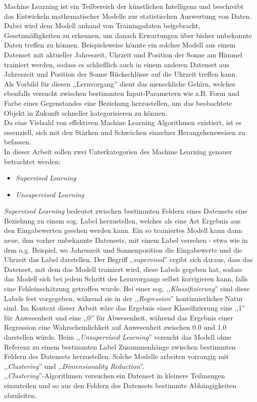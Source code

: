 Machine Learning ist ein Teilbereich der künstlichen Intelligenz und beschreibt das Entwickeln mathematischer 
Modelle zur statistischen Auswertung von Daten.\\
Dabei wird dem Modell anhand von Trainingsdaten beigebracht, Gesetzmäßigkeiten zu erkennen, um danach Erwartungen 
über bisher unbekannte Daten treffen zu können.  
Beispielsweise könnte ein solches Modell aus einem Datenset mit aktueller Jahreszeit, Uhrzeit und 
Position der Sonne am Himmel trainiert werden, sodass es schließlich auch in einem anderen Datenset 
aus Jahreszeit und Position der Sonne Rückschlüsse auf die Uhrzeit treffen kann.\\
Als Vorbild für diesen ,,Lernvorgang'' dient das menschliche Gehirn, welches ebenfalls versucht zwischen 
bestimmten Input-Parametern wie z.B. Form und Farbe eines Gegenstandes eine Beziehung herzustellen,
um das beobachtete Objekt in Zukunft schneller kategorisieren zu können.\\
Da eine Vielzahl von effektiven Machine Learning Algorithmen existiert, ist es essenziell, sich mit den
Stärken und Schwächen einzelner Herangehensweisen zu befassen.\\

In dieser Arbeit sollen zwei Unterkategorien des Machine Learning genauer betrachtet werden:
\begin{itemize}
    \item \textit{Supervised Learning} 
    \item \textit{Unsupervised Learning}
\end{itemize}
\textit{Supervised Learning} bedeutet zwischen bestimmten Feldern eines Datensets eine Beziehung
zu einem sog. Label herzustellen, welches als eine Art Ergebnis aus den Eingabewerten gesehen 
werden kann. Ein so trainiertes Modell kann dann neue, ihm vorher unbekannte Datensets, mit einem 
Label versehen - etwa wie in dem o.g. Beispiel, wo Jahreszeit und Sonnenposition die Eingabewerte 
und die Uhrzeit das Label darstellen. Der Begriff ,,\textit{supervised}'' ergibt sich daraus, dass 
das Datenset, mit dem das Modell trainiert wird, diese Labels gegeben 
hat, sodass das Modell sich bei jedem Schritt des Lernvorgangs selbst korrigieren kann, falls 
eine Fehleinschätzung getroffen wurde.
Bei einer sog. ,,\textit{Klassifizierung}'' sind diese Labels fest vorgegeben, während sie in der 
,,\textit{Regression}'' kontinuierlicher Natur sind. Im Kontext dieser Arbeit wäre das Ergebnis einer 
Klassifizierung eine ,,1'' für Anwesenheit und eine ,,0'' für Abwesenheit, während das Ergebnis einer 
Regression eine Wahrscheinlichkeit auf Anwesenheit zwischen 0.0 und 1.0 darstellen würde.
\newpage
Beim ,,\textit{Unsupervised Learning}'' versucht das Modell ohne Referenz zu einem bestimmten 
Label Zusammenhänge zwischen bestimmten Feldern des Datensets herzustellen. Solche Modelle 
arbeiten vorrangig mit ,,\textit{Clustering}'' und ,,\textit{Dimensionality Reduction}''.\\
,,\textit{Clustering}''-Algorithmen versuchen ein Datenset in kleinere Teilmengen einzuteilen und
so aus den Feldern des Datensets bestimmte Abhängigkeiten abzuleiten.

